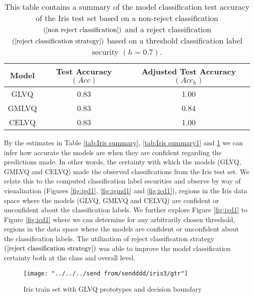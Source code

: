 \documentclass[english]{HSMW-Thesis}
\begin{document}
\begin{table}[H]
	\centering
	\begin{tabular}{ |c|c|c|  }
		\hline
		Model & Test Accuracy $(Acc)$ & Adjusted Test Accuracy $(Acc_{h})$   \\
		\hline
		GLVQ &0.83   &1.00   \\
		GMLVQ &0.83  &0.84   \\
		CELVQ &0.83  &1.00   \\		
		\hline
	\end{tabular}
	\caption[Summary of model classification test accuracy of the Iris test set]{\label{tab:Iris summary2}This table contains a summary of the model classification test accuracy of the Iris test set based on a non-reject classification\hspace{2pt}$(\ref{non reject classification})$\hspace{2pt} and a reject classification\hspace{2pt} $(\ref{reject classification strategy})$\hspace{2pt} based on a threshold classification label security\hspace{2pt} $(h=0.7)$.\hspace{2pt}}
\end{table}
By the estimates in Table \ref{tab:Iris summary}, \ref{tab:Iris summary1} and \ref{tab:Iris summary2} we can infer how accurate the models are when they are confident regarding the predictions made. In other words, the certainty with which the models (GLVQ, GMLVQ and CELVQ) made the observed classifications from the Iris test set. We relate this to the computed classification label securities and observe by way of visualization (Figures \ref{fig:igd1}, \ref{fig:igmd1} and \ref{fig:icd1}), regions in the Iris data space where the models (GLVQ, GMLVQ and CELVQ) are confident or unconfident about the classification labels. We further explore Figure \ref{fig:igd1} to Figure \ref{fig:icd1} where we can determine for any arbitrarily chosen threshold, regions in the data space where the models are confident or unconfident about the classification labels. The utilization of reject classification strategy $\left( \ref{reject classification strategy}\right) $ was able to improve the model classification certainty both at the class and overall level.

\begin{figure}[H]
	\centering
	\texttt{[image: "../../../send from/sendddd/iris3/gtr"]}
	\caption[Iris train set with GLVQ prototypes]{Iris train set with GLVQ prototypes and decision boundary}
	\label{fig:ig1}
\end{figure}
\end{document}
